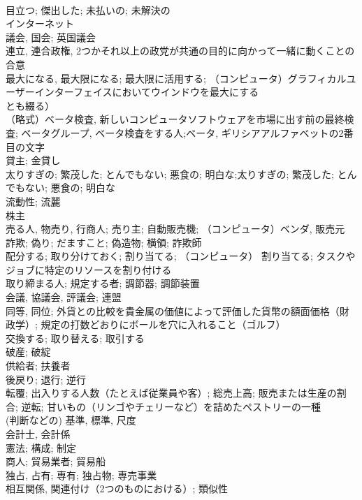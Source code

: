 \documentclass[8pt]{extreport}
\begin{document}
\begin{CJK}{UTF8}{min}
\\	目立つ; 傑出した; 未払いの; 未解決の	
\\	インターネット	
\\	議会, 国会; 英国議会	
\\	連立, 連合政権, 2つかそれ以上の政党が共通の目的に向かって一緒に動くことの合意	
\\	最大になる, 最大限になる; 最大限に活用する; （コンピュータ）グラフィカルユーザーインターフェイスにおいてウインドウを最大にする
\\	とも綴る）	
\\	（略式）ベータ検査, 新しいコンピュータソフトウェアを市場に出す前の最終検査; ベータグループ, ベータ検査をする人;ベータ, ギリシアアルファベットの2番目の文字	
\\	貸主; 金貸し	
\\	太りすぎの; 繁茂した; とんでもない; 悪食の; 明白な;太りすぎの; 繁茂した; とんでもない; 悪食の; 明白な	
\\	流動性; 流麗	
\\	株主	
\\	売る人, 物売り, 行商人; 売り主; 自動販売機; （コンピュータ）ベンダ, 販売元	
\\	詐欺; 偽り; だますこと; 偽造物; 横領; 詐欺師	
\\	配分する; 取り分けておく; 割り当てる; （コンピュータ） 割り当てる; タスクやジョブに特定のリソースを割り付ける	
\\	取り締まる人; 規定する者; 調節器; 調節装置	
\\	会議, 協議会, 評議会; 連盟	
\\	同等, 同位; 外貨との比較を貴金属の価値によって評価した貨幣の額面価格（財政学）; 規定の打数どおりにボールを穴に入れること（ゴルフ）	
\\	交換する; 取り替える; 取引する	
\\	破産; 破綻	
\\	供給者; 扶養者	
\\	後戻り; 退行; 逆行	
\\	転覆; 出入りする人数（たとえば従業員や客）; 総売上高; 販売または生産の割合; 逆転; 甘いもの（リンゴやチェリーなど）を詰めたペストリーの一種	
\\	(判断などの) 基準, 標準, 尺度	
\\	会計士, 会計係	
\\	憲法; 構成; 制定	
\\	商人; 貿易業者; 貿易船	
\\	独占, 占有; 専有; 独占物; 専売事業	
\\	相互関係, 関連付け（2つのものにおける）; 類似性	

\end{CJK}
\end{document}
